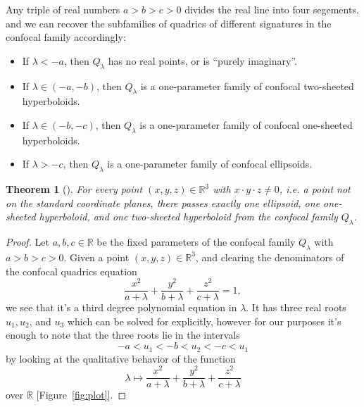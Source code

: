 \documentclass[10pt, a4paper]{article}
\theoremstyle{BoldTopSpacing}
\newtheorem{theorem}{Theorem}[section]
\theoremstyle{BoldTopSpacing}
\theoremstyle{BoldTopSpacing}
\theoremstyle{BoldTopBottomSpacing}
\theoremstyle{BoldTopSpacing}
\theoremstyle{BoldTopBottomSpacing}
\theoremstyle{remark}
\begin{document}
Any triple of real numbers $a > b > c > 0$ divides the real line into four segements, and we can recover the subfamilies of quadrics of different signatures in the confocal family accordingly:

\begin{itemize}[label=$\blacktriangleright$]
    \item If $\lambda < -a$, then $Q_{\lambda}$ has no real points, or is \enquote{purely imaginary}.
    \item If $\lambda \in (-a, -b)$, then $Q_{\lambda}$ is a one-parameter family of confocal two-sheeted hyperboloids.
    \item If $\lambda \in (-b, -c)$, then $Q_{\lambda}$ is a one-parameter family of confocal one-sheeted hyperboloids.
    \item If $\lambda > -c$, then $Q_{\lambda}$ is a one-parameter family of confocal ellipsoids. \par
\end{itemize}

\begin{theorem}[]
\label{thm:fill-up-euclidean-space}
For every point $(x, y, z) \in \mathbb{R}^3$ with $x \cdot y \cdot z \neq 0$, i.e. a point not on the standard coordinate planes, there passes exactly one ellipsoid, one one-sheeted hyperboloid, and one two-sheeted hyperboloid from the confocal family $Q_{\lambda}$.
\end{theorem}

\begin{proof}
    Let $a, b, c \in \mathbb{R}$ be the fixed parameters of the confocal family $Q_{\lambda}$ with $a > b > c > 0$. Given a point $(x, y, z) \in \mathbb{R}^3$, and clearing the denominators of the confocal quadrics equation
\[
    \frac{x^2}{a + \lambda} + \frac{y^2}{b + \lambda} + \frac{z^2}{c + \lambda} = 1,
\]
we see that it's a third degree polynomial equation in $\lambda$. It has three real roots $u_{1}, u_{2}$, and $u_{3}$ which can be solved for explicitly, however for our purposes it's enough to note that the three roots lie in the intervals
\[
    -a < u_{1} < -b < u_{2} < -c < u_{1}
\]
by looking at the qualitative behavior of the function
\[
    \lambda \mapsto \frac{x^2}{a + \lambda} + \frac{y^2}{b + \lambda} + \frac{z^2}{c + \lambda}
\]
over $\mathbb{R}$ [Figure~\ref{fig:plot}].
\end{proof}
\end{document}
